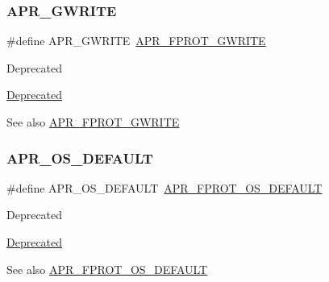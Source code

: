 \subsubsection{\texorpdfstring{A\+P\+R\+\_\+\+G\+W\+R\+I\+TE}{APR\_GWRITE}}
{\footnotesize\ttfamily \#define A\+P\+R\+\_\+\+G\+W\+R\+I\+TE~\mbox{\hyperlink{group__apr__file__permissions_gacecdc9f88b04c768150418688b786500}{A\+P\+R\+\_\+\+F\+P\+R\+O\+T\+\_\+\+G\+W\+R\+I\+TE}}}

\begin{DoxyRefDesc}{Deprecated}
\item[\mbox{\hyperlink{deprecated__deprecated000009}{Deprecated}}]\end{DoxyRefDesc}
\begin{DoxySeeAlso}{See also}
\mbox{\hyperlink{group__apr__file__permissions_gacecdc9f88b04c768150418688b786500}{A\+P\+R\+\_\+\+F\+P\+R\+O\+T\+\_\+\+G\+W\+R\+I\+TE}} 
\end{DoxySeeAlso}
\mbox{\label{group__apr__file__permissions_ga8552adb50d545d5fc7faeabb4f4a388f}} 
\subsubsection{\texorpdfstring{A\+P\+R\+\_\+\+O\+S\+\_\+\+D\+E\+F\+A\+U\+LT}{APR\_OS\_DEFAULT}}
{\footnotesize\ttfamily \#define A\+P\+R\+\_\+\+O\+S\+\_\+\+D\+E\+F\+A\+U\+LT~\mbox{\hyperlink{group__apr__file__permissions_gad3c65a67ee6eb12ecc6a33857397900b}{A\+P\+R\+\_\+\+F\+P\+R\+O\+T\+\_\+\+O\+S\+\_\+\+D\+E\+F\+A\+U\+LT}}}

\begin{DoxyRefDesc}{Deprecated}
\item[\mbox{\hyperlink{deprecated__deprecated000015}{Deprecated}}]\end{DoxyRefDesc}
\begin{DoxySeeAlso}{See also}
\mbox{\hyperlink{group__apr__file__permissions_gad3c65a67ee6eb12ecc6a33857397900b}{A\+P\+R\+\_\+\+F\+P\+R\+O\+T\+\_\+\+O\+S\+\_\+\+D\+E\+F\+A\+U\+LT}} 
\end{DoxySeeAlso}
\mbox{\label{group__apr__file__permissions_ga4c08d7e798ab4022e31ed70f06f202b5}} 

